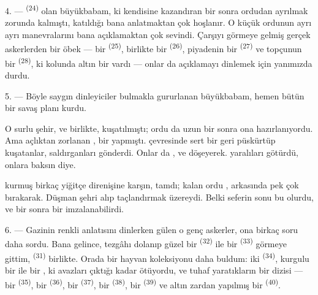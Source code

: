 \VUsaut{4.0mm}
\VUsaut{2.8mm}

4. ---  \textsuperscript{(24)} olan büyükbabam, ki
kendisine  kazandıran bir  sonra
ordudan ayrılmak zorunda kalmıştı, katıldığı  bana
anlatmaktan çok hoşlanır. O küçük ordunun ayrı ayrı manevralarını bana
açıklamaktan çok sevindi. Çarşıyı görmeye gelmiş gerçek askerlerden bir öbek
--- bir  \textsuperscript{(25)}, 
birlikte bir  \textsuperscript{(26)}, piyadenin bir
 \textsuperscript{(27)} ve topçunun bir 
\textsuperscript{(28)}, ki kolunda altın bir  vardı --- onlar da
açıklamayı dinlemek için yanımızda durdu.

5. --- Böyle saygın dinleyiciler bulmakla gururlanan büyükbabam, hemen bütün
bir savaş planı kurdu.

O surlu şehir,  ve  birlikte,
 kuşatılmıştı; ordu da uzun bir  sonra ona  hazırlanıyordu. Ama açlıktan
zorlanan ,   bir
 yapmıştı.  çevresinde sert bir
  geri püskürtüp 
kuşatanlar,  saldırganları   gönderdi. Onlar da ,
  ve  döşeyerek.
 yaralıları  götürdü,
 onlara baksın diye.

 kurmuş birkaç  yiğitçe direnişine karşın,
 tamdı; kalan ordu , arkasında pek çok
 bırakarak. Düşman şehri alıp  taçlandırmak
üzereydi. Belki seferin sonu bu olurdu, ve bir  sonra bir
 imzalanabilirdi.

\VUsaut{4.4mm}
\VUsaut{2.8mm}

6. --- Gazinin renkli anlatısını dinlerken gülen o genç askerler, ona birkaç
soru daha sordu. Bana gelince, tezgâhı dolanıp güzel bir 
\textsuperscript{(32)} ile bir  \textsuperscript{(33)} görmeye
gittim,  \textsuperscript{(31)} birlikte. Orada bir hayvan
koleksiyonu daha buldum: iki  \textsuperscript{(34)},
kurgulu bir  ile bir , ki avazları çıktığı
kadar ötüyordu, ve tuhaf yaratıkların bir dizisi --- bir 
\textsuperscript{(35)}, bir  \textsuperscript{(36)}, bir
 \textsuperscript{(37)}, bir 
\textsuperscript{(38)}, bir  \textsuperscript{(39)} ve altın
zardan yapılmış bir  \textsuperscript{(40)}.

